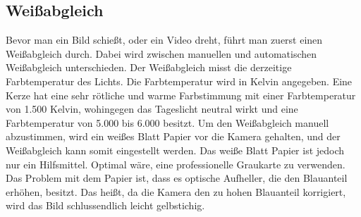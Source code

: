 \subsection{Weißabgleich}
Bevor man ein Bild schießt, oder ein Video dreht, führt man zuerst einen Weißabgleich durch. Dabei wird zwischen manuellen und automatischen Weißabgleich unterschieden. Der Weißabgleich misst die derzeitige Farbtemperatur des Lichts. Die Farbtemperatur wird in Kelvin angegeben. Eine Kerze hat eine sehr rötliche und warme Farbstimmung mit einer Farbtemperatur von 1.500 Kelvin, wohingegen das Tageslicht neutral wirkt und eine Farbtemperatur von 5.000 bis 6.000 besitzt. Um den Weißabgleich manuell abzustimmen, wird ein weißes Blatt Papier vor die Kamera gehalten, und der Weißabgleich kann somit eingestellt werden. Das weiße Blatt Papier ist jedoch nur ein Hilfsmittel. Optimal wäre, eine professionelle Graukarte zu verwenden. Das Problem mit dem Papier ist, dass es optische Aufheller, die den Blauanteil erhöhen, besitzt. Das heißt, da die Kamera den zu hohen Blauanteil korrigiert, wird das Bild schlussendlich leicht gelbstichig.\citep{weissabgleich}

